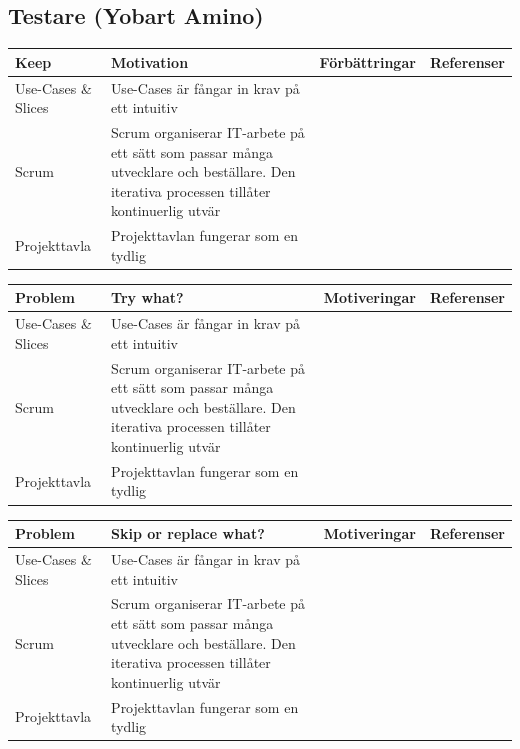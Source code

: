\documentclass[conference,a4paper]{IEEEtran}
\newcommand\Tstrut{\rule{0pt}{2.6ex}}       %
\newcommand\Bstrut{\rule[-0.9ex]{0pt}{0pt}} %
\newcommand{\TBstrut}{\Tstrut\Bstrut} %
\begin{document}
\subsection{Testare (Yobart Amino)}
\begin{table}[H]
	\small
  \centering
	\begin{tabular}{|p{1.5cm}|p{2cm}|p{1.8cm}|p{1.5cm}|} %
    \hline
    Keep & Motivation & Förbättringar & Referenser \TBstrut \\
    \hline
    Use-Cases \& Slices & Use-Cases är fångar in krav på ett intuitiv & & \TBstrut \\
    \hline
    Scrum & Scrum organiserar IT-arbete på ett sätt som passar många utvecklare och beställare. Den iterativa processen tillåter kontinuerlig utvär & & \TBstrut \\
    \hline
    Projekttavla & Projekttavlan fungerar som en tydlig & & \TBstrut \\
    \hline
  \end{tabular}
\end{table}

\begin{table}[H]
	\small
  \centering
	\begin{tabular}{|p{1.5cm}|p{2cm}|p{1.8cm}|p{1.5cm}|} %
    \hline
    Problem & Try what? & Motiveringar & Referenser \TBstrut \\
    \hline
    Use-Cases \& Slices & Use-Cases är fångar in krav på ett intuitiv & & \TBstrut \\
    \hline
    Scrum & Scrum organiserar IT-arbete på ett sätt som passar många utvecklare och beställare. Den iterativa processen tillåter kontinuerlig utvär & & \TBstrut \\
    \hline
    Projekttavla & Projekttavlan fungerar som en tydlig & & \TBstrut \\
    \hline
  \end{tabular}
\end{table}

\begin{table}[H]
	\small
  \centering
	\begin{tabular}{|p{1.5cm}|p{2cm}|p{1.8cm}|p{1.5cm}|} %
    \hline
    Problem & Skip or replace what? & Motiveringar & Referenser \TBstrut \\
    \hline
    Use-Cases \& Slices & Use-Cases är fångar in krav på ett intuitiv & & \TBstrut \\
    \hline
    Scrum & Scrum organiserar IT-arbete på ett sätt som passar många utvecklare och beställare. Den iterativa processen tillåter kontinuerlig utvär & & \TBstrut \\
    \hline
    Projekttavla & Projekttavlan fungerar som en tydlig & & \TBstrut \\
    \hline
  \end{tabular}
\end{table}
\end{document}
